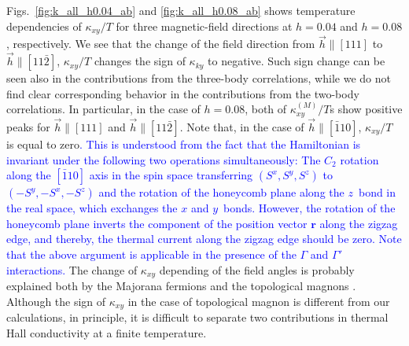 \documentclass[reprint,amsmath,amssymb,aps,prx]{revtex4-2}
\newcommand{\blue}[1]{\textcolor{blue}{#1}}
\begin{document}
Figs.~\ref{fig:k_all_h0.04_ab} and \ref{fig:k_all_h0.08_ab} shows temperature dependencies of $\kappa_{xy}/T$ for three magnetic-field directions at $h = 0.04$ and $h=0.08$, respectively. We see that the change of the field direction from $\vec{h} \parallel [111]$ to  $\vec{h}\parallel [11\bar{2}]$, $\kappa_{xy}/T$ changes the sign of $\kappa_{ky}$ to negative. Such sign change can be seen also in the contributions from the three-body correlations, while we do not find clear corresponding behavior in the contributions from the two-body correlations. In particular, in the case of $h = 0.08$, both of $\kappa^{(M)}_{xy}/T$s show positive peaks for $\vec{h} \parallel [111]$ and $\vec{h} \parallel [11\bar{2}]$. Note that, in the case of $\vec{h} \parallel [\bar{1}10]$, $\kappa_{xy}/T$ is equal to zero\blue{.
This is understood from the fact that the Hamiltonian is invariant under the following two operations simultaneously:
The $C_2$ rotation along the $[\bar{1}10]$ axis in the spin space transferring $(S^x,S^y,S^z)$ to $(-S^y,-S^x,-S^z)$ and the rotation of the honeycomb plane along the $z$~bond in the real space, which exchanges the $x$ and $y$~bonds.
However, the rotation of the honeycomb plane inverts the component of the position vector $\bm{r}$ along the zigzag edge, and thereby, the thermal current along the zigzag edge should be zero.
Note that the above argument is applicable in the presence of the $\Gamma$ and $\Gamma'$ interactions.
}
The change of $\kappa_{xy}$ depending of the field angles is probably explained both by the Majorana fermions \cite{Kitaev2006} and the topological magnons \cite{ChernZK2021}. Although the sign of $\kappa_{xy}$ in the case of topological magnon is different from our calculations, in principle, it is difficult to separate two contributions in thermal Hall conductivity at a finite temperature.
\end{document}
